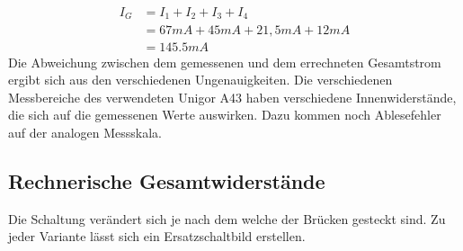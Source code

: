 \documentclass[
a4paper,     %
 headsepline, %
11pt         %
]{scrartcl}  %
\begin{document}
\begin{align}
I_G &= I_1 + I_2 + I_3 + I_4 \nonumber \\
    &= 67mA + 45mA + 21,5mA + 12mA \nonumber \\
    &= 145.5 mA \nonumber
\end{align}
Die Abweichung zwischen dem gemessenen und dem errechneten Gesamtstrom ergibt sich aus den verschiedenen Ungenauigkeiten. 
Die verschiedenen Messbereiche des verwendeten Unigor A43 haben verschiedene Innenwiderstände, die sich auf die gemessenen Werte auswirken. 
Dazu kommen noch Ablesefehler auf der analogen Messskala.

\subsection{Rechnerische Gesamtwiderstände}

Die Schaltung verändert sich je nach dem welche der Brücken gesteckt sind. Zu jeder Variante lässt sich ein Ersatzschaltbild erstellen.
\end{document}
